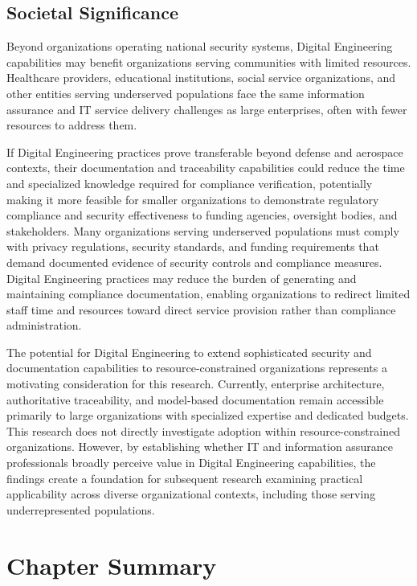 \subsection{Societal Significance}

Beyond organizations operating national security systems, Digital Engineering capabilities may benefit organizations serving communities with limited resources. Healthcare providers, educational institutions, social service organizations, and other entities serving underserved populations face the same information assurance and IT service delivery challenges as large enterprises, often with fewer resources to address them.

If Digital Engineering practices prove transferable beyond defense and aerospace contexts, their documentation and traceability capabilities could reduce the time and specialized knowledge required for compliance verification, potentially making it more feasible for smaller organizations to demonstrate regulatory compliance and security effectiveness to funding agencies, oversight bodies, and stakeholders. Many organizations serving underserved populations must comply with privacy regulations, security standards, and funding requirements that demand documented evidence of security controls and compliance measures. Digital Engineering practices may reduce the burden of generating and maintaining compliance documentation, enabling organizations to redirect limited staff time and resources toward direct service provision rather than compliance administration.

The potential for Digital Engineering to extend sophisticated security and documentation capabilities to resource-constrained organizations represents a motivating consideration for this research. Currently, enterprise architecture, authoritative traceability, and model-based documentation remain accessible primarily to large organizations with specialized expertise and dedicated budgets. This research does not directly investigate adoption within resource-constrained organizations. However, by establishing whether IT and information assurance professionals broadly perceive value in Digital Engineering capabilities, the findings create a foundation for subsequent research examining practical applicability across diverse organizational contexts, including those serving underrepresented populations.

\section{Chapter Summary}

